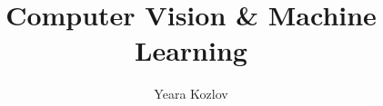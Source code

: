 \documentclass[10pt,a4paper,BCOR10mm,DIV14,headings=big,chapterprefix=false,version=first,twoside,headinclude]{book}
\begin{document}

\title{Computer Vision & Machine Learning}
\author{Yeara Kozlov}

\frontmatter
% 


% 


{}
\tableofcontents
\clearemptydoublepage





\setcounter{page}{1}


\end{document}
